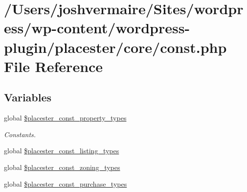 \hypertarget{const_8php}{
\section{/Users/joshvermaire/Sites/wordpress/wp-\/content/wordpress-\/plugin/placester/core/const.php File Reference}
\label{d0/d02/const_8php}
}
\subsection*{Variables}
\begin{DoxyCompactItemize}
\item 
global \hyperlink{const_8php_ad6a28f759645d7ccdcadc88cbfddc555}{\$placester\_\-const\_\-property\_\-types}
\begin{DoxyCompactList}\small\item\em Constants. \end{DoxyCompactList}\item 
global \hyperlink{const_8php_ab3c50e93ac45d1f7185c74f2ba00fd11}{\$placester\_\-const\_\-listing\_\-types}
\item 
global \hyperlink{const_8php_a5e04c7d3b6395dc0b9b32d9aa7b0afb5}{\$placester\_\-const\_\-zoning\_\-types}
\item 
global \hyperlink{const_8php_ae2a8e9945874c6e2e7346d04ece006cc}{\$placester\_\-const\_\-purchase\_\-types}
\end{DoxyCompactItemize}


